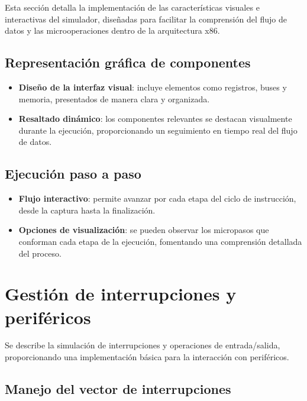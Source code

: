 \documentclass[12pt,oneside]{templates/unerthesis}
\providecommand{\tightlist}{%
  \setlength{\itemsep}{0pt}\setlength{\parskip}{0pt}}
\begin{document}
Esta sección detalla la implementación de las características visuales e interactivas del simulador, diseñadas para facilitar la comprensión del flujo de datos y las microoperaciones dentro de la arquitectura x86.

\hypertarget{representaciuxf3n-gruxe1fica-de-componentes}{%
\subsection{Representación gráfica de componentes}\label{representaciuxf3n-gruxe1fica-de-componentes}}

\begin{itemize}
\tightlist
\item
  \textbf{Diseño de la interfaz visual}: incluye elementos como registros, buses y memoria, presentados de manera clara y organizada.
\item
  \textbf{Resaltado dinámico}: los componentes relevantes se destacan visualmente durante la ejecución, proporcionando un seguimiento en tiempo real del flujo de datos.
\end{itemize}

\hypertarget{ejecuciuxf3n-paso-a-paso}{%
\subsection{Ejecución paso a paso}\label{ejecuciuxf3n-paso-a-paso}}

\begin{itemize}
\tightlist
\item
  \textbf{Flujo interactivo}: permite avanzar por cada etapa del ciclo de instrucción, desde la captura hasta la finalización.
\item
  \textbf{Opciones de visualización}: se pueden observar los micropasos que conforman cada etapa de la ejecución, fomentando una comprensión detallada del proceso.
\end{itemize}

\hypertarget{gestiuxf3n-de-interrupciones-y-perifuxe9ricos}{%
\section{Gestión de interrupciones y periféricos}\label{gestiuxf3n-de-interrupciones-y-perifuxe9ricos}}

Se describe la simulación de interrupciones y operaciones de entrada/salida, proporcionando una implementación básica para la interacción con periféricos.

\hypertarget{manejo-del-vector-de-interrupciones}{%
\subsection{Manejo del vector de interrupciones}\label{manejo-del-vector-de-interrupciones}}
\end{document}
